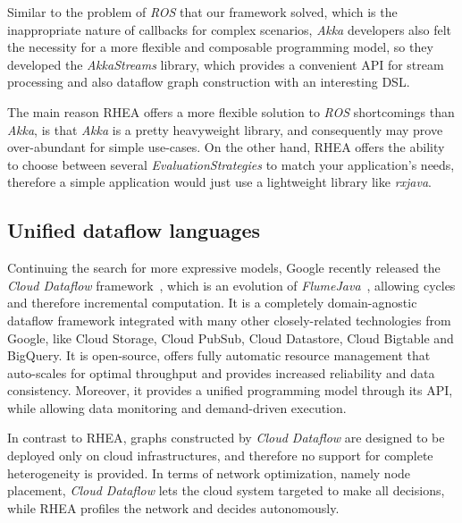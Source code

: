 \documentclass[sigplan,screen]{acmart}
\begin{document}
Similar to the problem of \textit{ROS} that our framework solved, which is the
inappropriate nature of callbacks for complex scenarios, \textit{Akka}
developers also felt the necessity for a more flexible and composable
programming model, so they developed the \textit{AkkaStreams} library, which
provides a convenient API for stream processing and also dataflow graph
construction with an interesting DSL.

The main reason \textsc{RHEA} offers a more flexible solution to \textit{ROS}
shortcomings than \textit{Akka}, is that \textit{Akka} is a pretty heavyweight
library, and consequently may prove over-abundant for simple use-cases. On the
other hand, \textsc{RHEA} offers the ability to choose between several
\textit{EvaluationStrategies} to match your application's needs, therefore a
simple application would just use a lightweight library like \textit{rxjava}.

\subsection{Unified dataflow languages}
Continuing the search for more expressive models, Google recently released the
\textit{Cloud Dataflow} framework~,
which is an evolution of \textit{FlumeJava}~\cite{flumejava}, allowing cycles and
therefore incremental computation.
It is a completely domain-agnostic dataflow framework integrated with many other
closely-related technologies from Google, like Cloud Storage, Cloud PubSub,
Cloud Datastore, Cloud Bigtable and BigQuery.
It is open-source, offers fully automatic resource management that auto-scales
for optimal throughput and provides increased reliability and data consistency.
Moreover, it provides a unified programming model through its API, while
allowing data monitoring and demand-driven execution.

In contrast to \textsc{RHEA}, graphs constructed by \textit{Cloud Dataflow} are
designed to be deployed only on cloud infrastructures, and therefore no support
for complete heterogeneity is provided. In terms of network optimization, namely
node placement,  \textit{Cloud Dataflow} lets the cloud system targeted to make
all decisions, while \textsc{RHEA} profiles the network and decides
autonomously.
\end{document}
